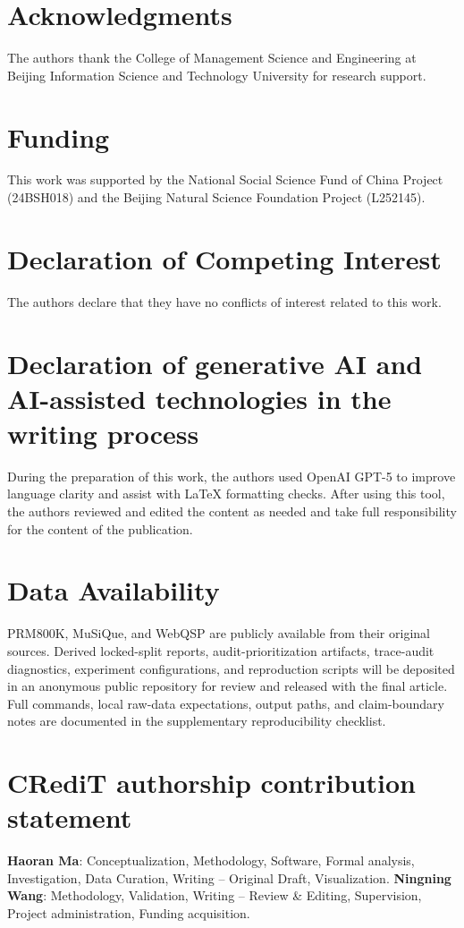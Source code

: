 \documentclass[a4paper,fleqn]{cas-sc}
\begin{document}
\section*{Acknowledgments}
The authors thank the College of Management Science and Engineering at Beijing Information Science and Technology University for research support.

\section*{Funding}
This work was supported by the National Social Science Fund of China Project (24BSH018) and the Beijing Natural Science Foundation Project (L252145).

\section*{Declaration of Competing Interest}
The authors declare that they have no conflicts of interest related to this work.

\section*{Declaration of generative AI and AI-assisted technologies in the writing process}
During the preparation of this work, the authors used OpenAI GPT-5 to improve language clarity and assist with LaTeX formatting checks. After using this tool, the authors reviewed and edited the content as needed and take full responsibility for the content of the publication.

\section*{Data Availability}
PRM800K, MuSiQue, and WebQSP are publicly available from their original sources. Derived locked-split reports, audit-prioritization artifacts, trace-audit diagnostics, experiment configurations, and reproduction scripts will be deposited in an anonymous public repository for review and released with the final article. Full commands, local raw-data expectations, output paths, and claim-boundary notes are documented in the supplementary reproducibility checklist.

\section*{CRediT authorship contribution statement}
\textbf{Haoran Ma}: Conceptualization, Methodology, Software, Formal analysis, Investigation, Data Curation, Writing -- Original Draft, Visualization. \textbf{Ningning Wang}: Methodology, Validation, Writing -- Review \& Editing, Supervision, Project administration, Funding acquisition.
\end{document}
